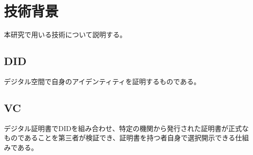 \chapter{技術背景}
\label{chap:technology}
本研究で用いる技術について説明する。
\section{DID}
デジタル空間で自身のアイデンティティを証明するものである。


\section{VC}
デジタル証明書でDIDを組み合わせ、特定の機関から発行された証明書が正式なものであることを第三者が検証でき、証明書を持つ者自身で選択開示できる仕組みである。

\begin{comment}

\section{まとめ}

\LaTeX の環境さえあればスタンダードな体裁の論文がたぶんだれでも作れる程度のテンプレートにはなっているはず。がんばって卒業しよう。


\section{大事なこと}

箇条書きで列挙する。

\begin{itemize}
 \item ぐぐる。これは単なる\LaTeX だし、\LaTeX はもう枯れた技術だから、調べれば文献はいくらでもある。
 \item 先生を頼る。
 \item 単位をきちんとる。
 \item 卒業する。
\end{itemize}


\end{comment}